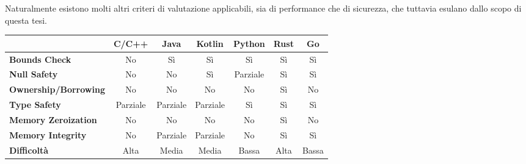 Naturalmente esistono molti altri criteri di valutazione applicabili, sia di performance
che di sicurezza, che tuttavia esulano dallo scopo di questa tesi.

\setlength{\tabcolsep}{4pt}
\begin{table}[H]
  \small
  \centering
  \begin{threeparttable}
    \begin{tabular}{l|c|c|c|c|c|c|}
      \multicolumn{1}{l}{}           & \textbf{C/C++}                & \textbf{Java}                 & \textbf{Kotlin}               & \textbf{Python}               & \textbf{Rust}                    & \textbf{Go}                      \\
      \hline
      \textbf{Bounds Check}          & \cellcolor{red!20}No          & \cellcolor{green!20}Sì        & \cellcolor{green!20}Sì        & \cellcolor{green!20}Sì        & \cellcolor{green!20}Sì           & \cellcolor{green!20}Sì           \\
      \textbf{Null Safety}           & \cellcolor{red!20}No          & \cellcolor{red!20}No          & \cellcolor{green!20}Sì        & \cellcolor{yellow!20}Parziale & \cellcolor{green!20}Sì           & \cellcolor{green!20}Sì           \\
      \textbf{Ownership/Borrowing}   & \cellcolor{red!20}No          & \cellcolor{red!20}No          & \cellcolor{red!20}No          & \cellcolor{red!20}No          & \cellcolor{green!20}Sì           & \cellcolor{red!20}No             \\
      \textbf{Type Safety}           & \cellcolor{yellow!20}Parziale & \cellcolor{yellow!20}Parziale & \cellcolor{yellow!20}Parziale & \cellcolor{green!20}Sì        & \cellcolor{green!20}Sì           & \cellcolor{green!20}Sì           \\
      \textbf{Memory Zeroization}    & \cellcolor{red!20}No          & \cellcolor{red!20}No          & \cellcolor{red!20}No          & \cellcolor{red!20}No          & \cellcolor{green!20}Sì\tnote{a}  & \cellcolor{red!20}No             \\
      \textbf{Memory Integrity}      & \cellcolor{red!20}No          & \cellcolor{yellow!20}Parziale & \cellcolor{yellow!20}Parziale & \cellcolor{red!20}No          & \cellcolor{green!20}Sì           & \cellcolor{green!20}Sì           \\
      \hline
      \textbf{Difficoltà}\tnote{b}   & \cellcolor{red!20}Alta        & \cellcolor{yellow!20}Media    & \cellcolor{yellow!20}Media    & \cellcolor{green!20}Bassa     & \cellcolor{red!20}Alta           & \cellcolor{green!20}Bassa        \\

\end{tabular}
\end{threeparttable}
\end{table}
